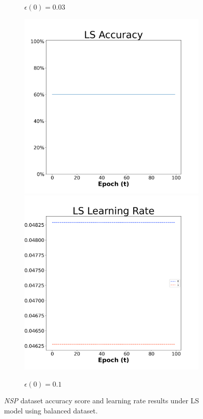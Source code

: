 \begin{figure}[H]
\begin{subfigure}{0.3\textwidth}
  \caption{$\epsilon(0)=0.03$}
\end{subfigure}\hfil %
\begin{subfigure}{0.3\textwidth}
  \includegraphics[width=\linewidth]{images/exper1/NSP/LS_0.1_acc.png}
  \includegraphics[width=\linewidth]{images/exper1/NSP/LS_0.1_lr.png}
  \caption{$\epsilon(0)=0.1$}
\end{subfigure}

\caption{\textit{NSP} dataset accuracy score and learning rate results under LS model using balanced dataset.}
\end{figure}

